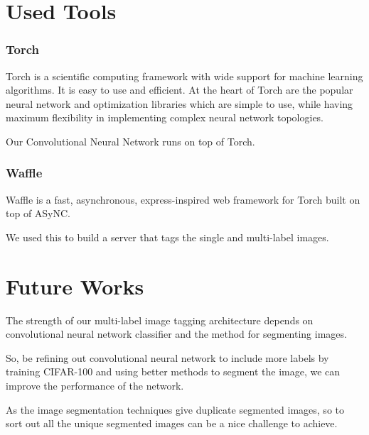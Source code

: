 \section{Used Tools}
\subsubsection{Torch}
Torch is a scientific computing framework with wide support for machine learning algorithms. It is easy to use and efficient. At the heart of Torch are the popular neural network and optimization libraries which are simple to use, while having maximum flexibility in implementing complex neural network topologies.\hfill \break 

Our Convolutional Neural Network runs on top of Torch.

\subsubsection{Waffle}
Waffle is a fast, asynchronous, express-inspired web framework for Torch built on top of ASyNC. \hfill \break

We used this to build a server that tags the single and multi-label images.

\section{Future Works}
The strength of our multi-label image tagging architecture depends on convolutional neural network classifier and the method for segmenting images.\hfill \break

So, be refining out convolutional neural network to include more labels by training CIFAR-100 and using better methods to segment the image, we can improve the performance of the network.\hfill \break

As the image segmentation techniques give duplicate segmented images, so to sort out all the unique segmented images can be a nice challenge to achieve.